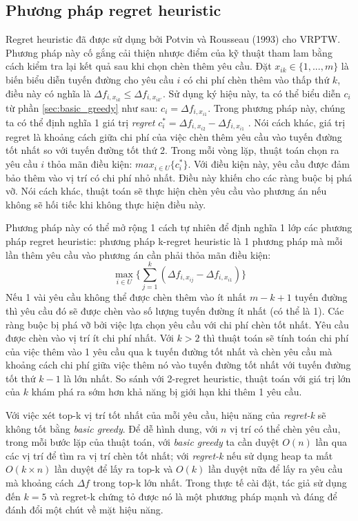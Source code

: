 \subsection{Phương pháp regret heuristic}
Regret heuristic đã được sử dụng bởi Potvin và Rousseau (1993) \cite{} cho VRPTW. Phương pháp này cố gắng cải thiện nhược điểm của kỹ thuật tham lam bằng cách kiểm tra lại kết quả sau khi chọn chèn thêm yêu cầu. Đặt $x_{ik} \in \{1, ..., m\}$ là biến biểu diễn tuyến đường cho yêu cầu $i$ có chi phí chèn thêm vào thấp thứ $k$, điều này có nghĩa là $\Delta f_{i, x_{ik}} \leqslant \Delta f_{i, x_{ik'}}$. Sử dụng ký hiệu này, ta có thể biểu diễn $c_i$ từ phần \ref{sec:basic_greedy} như sau: $c_i = \Delta f_{i, x_{i1}}$. Trong phương pháp này, chúng ta có thể định nghĩa 1 giá trị \textit{regret} $c_i^* = \Delta f_{i, x_{i2}} - \Delta f_{i, x_{i1}}$ . Nói cách khác, giá trị regret là khoảng cách giữa chi phí của việc chèn thêm yêu cầu vào tuyến đường tốt nhất so với tuyến đường tốt thứ 2. Trong mỗi vòng lặp, thuật toán chọn ra yêu cầu $i$ thỏa mãn điều kiện: $max_{i \in U} \{c_i^*\}$. Với điều kiện này, yêu cầu được đảm bảo thêm vào vị trí có chi phí nhỏ nhất. Điều này khiến cho các ràng buộc bị phá vỡ. Nói cách khác, thuật toán sẽ thực hiện chèn yêu cầu vào phương án nếu không sẽ hối tiếc khi không thực hiện điều này.

Phương pháp này có thể mở rộng 1 cách tự nhiên để định nghĩa 1 lớp các phương pháp regret heuristic: phương pháp k-regret heuristic là 1 phương pháp mà mỗi lần thêm yêu cầu vào phương án cần phải thỏa mãn điều kiện:
\begin{equation}
    \max\limits_{i \in U} \{ \sum_{j=1}^k (\Delta f_{i, x_{ij}} - \Delta f_{i, x_{i1}}) \}
\end{equation}
Nếu 1 vài yêu cầu không thể được chèn thêm vào ít nhất $m-k+1$ tuyến đường thì yêu cầu đó sẽ được chèn vào số lượng tuyến đường ít nhất (có thể là 1). Các ràng buộc bị phá vỡ bởi việc lựa chọn yêu cầu với chi phí chèn tốt nhất. Yêu cầu được chèn vào vị trí ít chi phí nhất. Với $k>2$ thì thuật toán sẽ tính toán chi phí của việc thêm vào 1 yêu cầu qua k tuyến đường tốt nhất và chèn yêu cầu mà khoảng cách chi phí giữa việc thêm nó vào tuyến đường tốt nhất với tuyến đường tốt thứ $k-1$ là lớn nhất. So sánh với 2-regret heuristic, thuật toán với giá trị lớn của $k$ khám phá ra sớm hơn khả năng bị giới hạn khi thêm 1 yêu cầu.

Với việc xét top-k vị trí tốt nhất của mỗi yêu cầu, hiệu năng của \textit{regret-k} sẽ không tốt bằng \textit{basic greedy}. Để dễ hình dung, với $n$ vị trí có thể chèn yêu cầu, trong mỗi bước lặp của thuật toán, với \textit{basic greedy} ta cần duyệt $O(n)$ lần qua các vị trí để tìm ra vị trí chèn tốt nhất; với \textit{regret-k} nếu sử dụng heap ta mất $O(k \times n)$ lần duyệt để  lấy ra top-k và $O(k)$ lần duyệt nữa để lấy ra yêu cầu mà khoảng cách $\Delta f$ trong top-k lớn nhất. Trong thực tế cài đặt, tác giả sử dụng đến $k=5$ và regret-k chứng tỏ được nó là một phương pháp mạnh và đáng để đánh đổi một chút về mặt hiệu năng. 